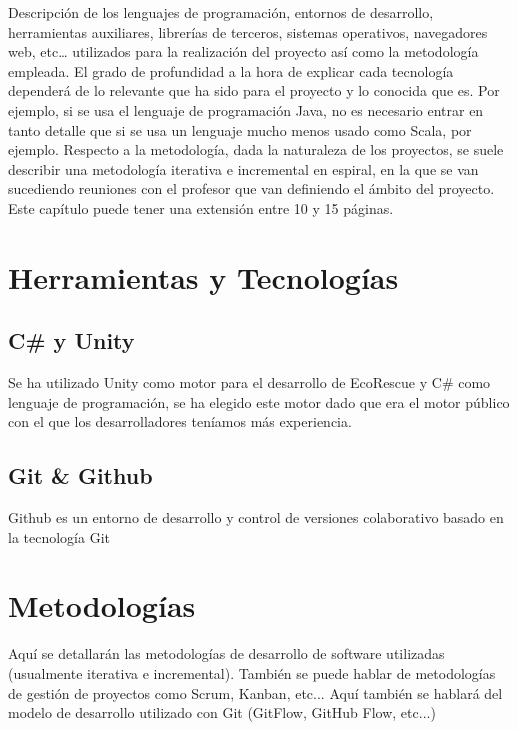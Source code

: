 Descripción de los lenguajes de programación, entornos de desarrollo, herramientas auxiliares, librerías de terceros, sistemas operativos, navegadores web, etc… utilizados para la realización del proyecto así como la metodología empleada. 
El grado de profundidad a la hora de explicar cada tecnología dependerá de lo relevante que ha sido para el proyecto y lo conocida que es. 
Por ejemplo, si se usa el lenguaje de programación Java, no es necesario entrar en tanto detalle que si se usa un lenguaje mucho menos usado como Scala, por ejemplo. Respecto a la metodología, dada la naturaleza de los proyectos, se suele describir una metodología iterativa e incremental en espiral, en la que se van sucediendo reuniones con el profesor que van definiendo el ámbito del proyecto. Este capítulo puede tener una extensión entre 10 y 15 páginas.
\section{Herramientas y Tecnologías}

\subsection{C\# y Unity}

Se ha utilizado Unity\cite{unity} como motor para el desarrollo de EcoRescue y C\#\cite{csharp} como lenguaje de programación, se ha elegido este motor dado que era el motor público con el que los desarrolladores teníamos más experiencia.

\subsection{Git \& Github}

Github \cite{github} es un entorno de desarrollo y control de versiones colaborativo basado en la tecnología Git 

\section{Metodologías}

Aquí se detallarán las metodologías de desarrollo de software utilizadas (usualmente iterativa e incremental). 
También se puede hablar de metodologías de gestión de proyectos como Scrum, Kanban, etc... 
Aquí también se hablará del modelo de desarrollo utilizado con Git (GitFlow, GitHub Flow, etc...)
